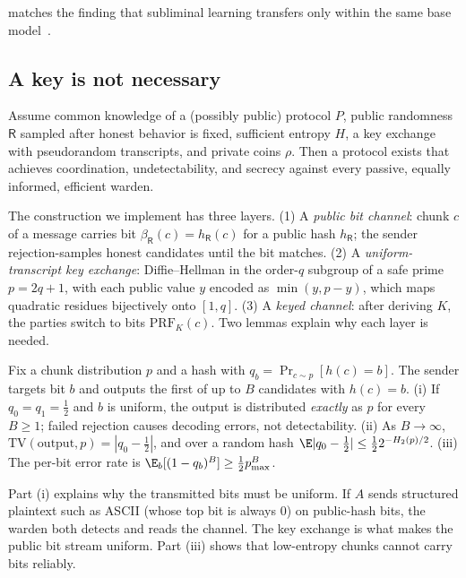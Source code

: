  matches the finding that subliminal learning transfers only within the same base model~\citep{cloud2025subliminal}.

\subsection{A key is not necessary}

\begin{theorem}
\label{thm:keyless}
Assume common knowledge of a (possibly public) protocol $P$, public randomness $\mathsf{R}$ sampled after honest behavior is fixed, sufficient entropy $H$, a key exchange with pseudorandom transcripts, and private coins $\rho$. Then a protocol exists that achieves coordination, undetectability, and secrecy against every passive, equally informed, efficient warden.
\end{theorem}

The construction we implement has three layers. (1) A \emph{public bit channel}: chunk $c$ of a message carries bit $\beta_{\mathsf{R}}(c) = h_{\mathsf{R}}(c)$ for a public hash $h_{\mathsf{R}}$; the sender rejection-samples honest candidates until the bit matches. (2) A \emph{uniform-transcript key exchange}: Diffie--Hellman in the order-$q$ subgroup of a safe prime $p = 2q+1$, with each public value $y$ encoded as $\min(y, p-y)$, which maps quadratic residues bijectively onto $[1,q]$. (3) A \emph{keyed channel}: after deriving $K$, the parties switch to bits $\mathrm{PRF}_K(c)$. Two lemmas explain why each layer is needed.

\begin{lemma}
\label{lem:bias}
Fix a chunk distribution $p$ and a hash with $q_b = \Pr_{c\sim p}[h(c)=b]$. The sender targets bit $b$ and outputs the first of up to $B$ candidates with $h(c)=b$. (i) If $q_0=q_1=\tfrac12$ and $b$ is uniform, the output is distributed \emph{exactly} as $p$ for every $B \geq 1$; failed rejection causes decoding errors, not detectability. (ii) As $B\to\infty$, $\mathrm{TV}(\text{output}, p) = |q_0 - \tfrac12|$, and over a random hash $\E|q_0-\tfrac12| \leq \tfrac12 2^{-H_2(p)/2}$. (iii) The per-bit error rate is $\E_b[(1-q_b)^B] \geq \tfrac12 p_{\max}^B$.
\end{lemma}

Part (i) explains why the transmitted bits must be uniform. If $A$ sends structured plaintext such as ASCII (whose top bit is always 0) on public-hash bits, the warden both detects and reads the channel. The key exchange is what makes the public bit stream uniform. Part (iii) shows that low-entropy chunks cannot carry bits reliably.

